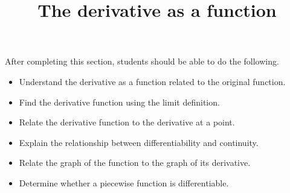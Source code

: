 \documentclass{ximera}
\title{The derivative as a function}
\begin{document}
\begin{abstract}
\end{abstract}

\maketitle

\begin{sectionOutcomes}

After completing this section, students should be able to do the following.

\begin{itemize}
\item Understand the derivative as a function related to the original function.
\item Find the derivative function using the limit definition.
\item Relate the derivative function to the derivative at a point.
\item Explain the relationship between differentiability and continuity.
\item Relate the graph of the function to the graph of its derivative.
\item Determine whether a piecewise function is differentiable.
\end{itemize}

\end{sectionOutcomes}
\end{document}
